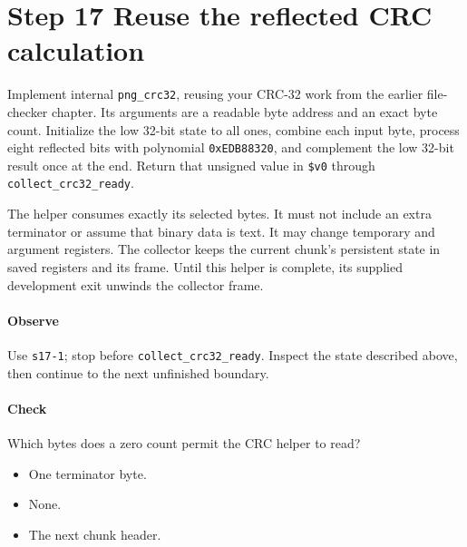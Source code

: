 \section{Step 17 Reuse the reflected CRC calculation}\label{png-collect-s17}
Implement internal \texttt{png\_crc32}, reusing your CRC-32 work from the earlier file-checker chapter. Its arguments are a readable byte address and an exact byte count. Initialize the low 32-bit state to all ones, combine each input byte, process eight reflected bits with polynomial \texttt{0xEDB88320}, and complement the low 32-bit result once at the end. Return that unsigned value in \texttt{\$v0} through \texttt{collect\_crc32\_ready}.

The helper consumes exactly its selected bytes. It must not include an extra terminator or assume that binary data is text. It may change temporary and argument registers. The collector keeps the current chunk's persistent state in saved registers and its frame. Until this helper is complete, its supplied development exit unwinds the collector frame.

\paragraph{Observe} Use \texttt{s17-1}; stop before \texttt{collect\_crc32\_ready}. Inspect the state described above, then continue to the next unfinished boundary.

\paragraph{Check} Which bytes does a zero count permit the CRC helper to read?
\begin{itemize}
  \item[A.] One terminator byte.
  \item[B.] None.
  \item[C.] The next chunk header.
\end{itemize}
